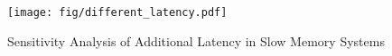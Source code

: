 \begin{figure}[tp]
  \centering
  \texttt{[image: fig/different\_latency.pdf]}
  \caption{Sensitivity Analysis of Additional Latency in Slow Memory Systems}
  \label{fig:different_latency}
\end{figure}